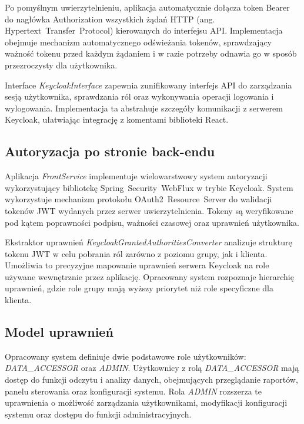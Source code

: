 Po pomyślnym uwierzytelnieniu, aplikacja automatycznie dołącza token Bearer do nagłówka Authorization wszystkich żądań HTTP (ang. \mbox{Hypertext Transfer Protocol}) kierowanych do interfejsu API. Implementacja obejmuje mechanizm automatycznego odświeżania tokenów, sprawdzający ważność tokenu przed każdym żądaniem i w razie potrzeby odnawia go w sposób przezroczysty dla użytkownika.

Interface \textit{KeycloakInterface} zapewnia zunifikowany interfejs API do zarządzania sesją użytkownika, sprawdzania ról oraz wykonywania operacji logowania i wylogowania. Implementacja ta abstrahuje szczegóły komunikacji z serwerem Keycloak, ułatwiając integrację z komentami biblioteki React.

\subsection{Autoryzacja po stronie back-endu}

Aplikacja \textit{FrontService} implementuje wielowarstwowy system autoryzacji wykorzystujący bibliotekę \mbox{Spring Security WebFlux} w trybie Keycloak. System wykorzystuje mechanizm protokołu \mbox{OAuth2 Resource Server} do walidacji tokenów \mbox{JWT} wydanych przez serwer uwierzytelnienia. Tokeny są weryfikowane pod kątem poprawności podpisu, ważności czasowej oraz uprawnień użytkownika.

Ekstraktor uprawnień \textit{KeycloakGrantedAuthoritiesConverter} analizuje strukturę tokenu \mbox{JWT} w celu pobrania ról zarówno z poziomu grupy, jak i klienta. Umożliwia to precyzyjne mapowanie uprawnień serwera Keycloak na role używane wewnętrznie przez aplikację. Opracowany system rozpoznaje hierarchię uprawnień, gdzie role grupy mają wyższy priorytet niż role specyficzne dla klienta.

\subsection{Model uprawnień}

Opracowany system definiuje dwie podstawowe role użytkowników: \textit{\mbox{DATA\_ACCESSOR}} oraz \textit{\mbox{ADMIN}}. Użytkownicy z rolą \textit{\mbox{DATA\_ACCESSOR}} mają dostęp do funkcji odczytu i analizy danych, obejmujących przeglądanie raportów, panelu sterowania oraz konfiguracji systemu. Rola \textit{\mbox{ADMIN}} rozszerza te uprawnienia o możliwość zarządzania użytkownikami, modyfikacji konfiguracji systemu oraz dostępu do funkcji administracyjnych.

